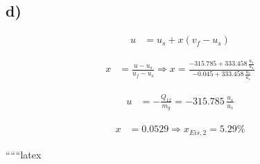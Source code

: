 

\subsection*{d)}

\begin{align*}
u &= u_s + x(v_f - u_s)
\end{align*}

\begin{align*}
x &= \frac{u - u_s}{u_f - u_s} \Rightarrow x = \frac{-315.785 + 333.458 \, \frac{u_s}{u_s}}{-0.045 + 333.458 \, \frac{u_s}{u_s}}
\end{align*}

\begin{align*}
u &= -\frac{Q_{12}}{m_g} = -315.785 \, \frac{u_s}{u_s}
\end{align*}

\begin{align*}
x &= 0.0529 \Rightarrow x_{Eis,2} = 5.29\%
\end{align*}

``````latex